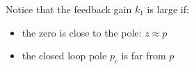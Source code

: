 Notice that the feedback gain $k_{1}$ is large if:
\begin{itemize}
	\item the zero is close to the pole: $z\approx p$
	\item the closed loop pole $p_c$ is far from $p$
\end{itemize}

\endinput

